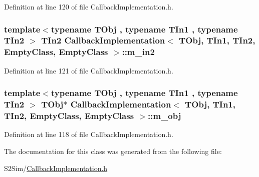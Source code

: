 Definition at line 120 of file Callback\-Implementation.\-h.

\hypertarget{class_callback_implementation_3_01_t_obj_00_01_t_in1_00_01_t_in2_00_01_empty_class_00_01_empty_class_01_4_a8031ffbf7b37baaf1f9016b6429c1c0c}{
\subsubsection[{m\-\_\-in2}]{\setlength{\rightskip}{0pt plus 5cm}template$<$typename T\-Obj , typename T\-In1 , typename T\-In2 $>$ T\-In2 {\bf Callback\-Implementation}$<$ T\-Obj, T\-In1, T\-In2, {\bf Empty\-Class}, {\bf Empty\-Class} $>$\-::m\-\_\-in2\hspace{0.3cm}{\ttfamily [private]}}}\label{class_callback_implementation_3_01_t_obj_00_01_t_in1_00_01_t_in2_00_01_empty_class_00_01_empty_class_01_4_a8031ffbf7b37baaf1f9016b6429c1c0c}


Definition at line 121 of file Callback\-Implementation.\-h.

\hypertarget{class_callback_implementation_3_01_t_obj_00_01_t_in1_00_01_t_in2_00_01_empty_class_00_01_empty_class_01_4_a08d3ffaab2b31e3e830a5b0d2ff62d00}{
\subsubsection[{m\-\_\-obj}]{\setlength{\rightskip}{0pt plus 5cm}template$<$typename T\-Obj , typename T\-In1 , typename T\-In2 $>$ T\-Obj$\ast$ {\bf Callback\-Implementation}$<$ T\-Obj, T\-In1, T\-In2, {\bf Empty\-Class}, {\bf Empty\-Class} $>$\-::m\-\_\-obj\hspace{0.3cm}{\ttfamily [private]}}}\label{class_callback_implementation_3_01_t_obj_00_01_t_in1_00_01_t_in2_00_01_empty_class_00_01_empty_class_01_4_a08d3ffaab2b31e3e830a5b0d2ff62d00}


Definition at line 118 of file Callback\-Implementation.\-h.



The documentation for this class was generated from the following file\-:\begin{DoxyCompactItemize}
\item 
S2\-Sim/\hyperlink{_callback_implementation_8h}{Callback\-Implementation.\-h}\end{DoxyCompactItemize}

